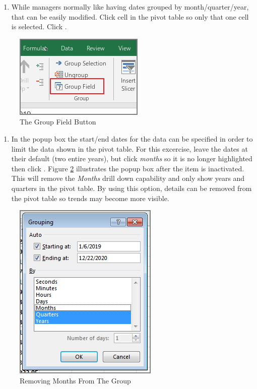 \begin{enumerate}[resume]
	\item While managers normally like having dates grouped by month/quarter/year, that can be easily modified. Click cell  in the pivot table so only that one cell is selected. Click .
\end{enumerate}

\begin{figure}[H]
	\centering
	\includegraphics[width=\maxwidth{.95\linewidth}]{gfx/ch07_fig23}
	\caption{The Group Field Button}
	\label{07:fig23}
\end{figure}

\begin{enumerate}[resume]
	\item In the  popup box the start/end dates for the data can be specified in order to limit the data shown in the pivot table. For this excercise, leave the dates at their default (two entire years), but click \textit{months} so it is no longer highlighted then click . Figure \ref{07:fig24} illustrates the  popup box after the  item is inactivated. This will remove the \textit{Months} drill down capability and only show years and quarters in the pivot table. By using this option, details can be removed from the pivot table so trends may become more visible.
\end{enumerate}

\begin{figure}[H]
	\centering
	\includegraphics[width=\maxwidth{.95\linewidth}]{gfx/ch07_fig24}
	\caption{Removing Months From The Group}
	\label{07:fig24}
\end{figure}

